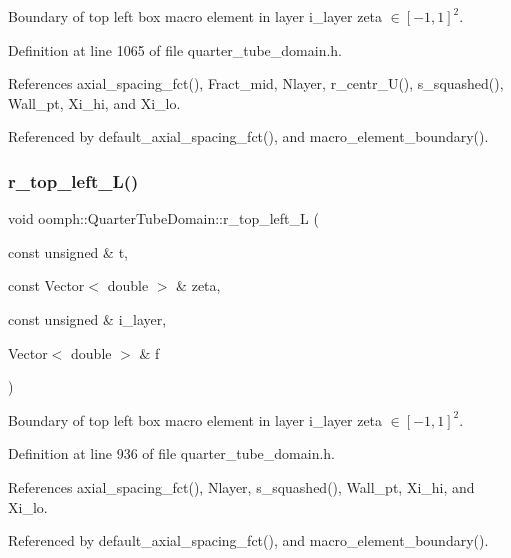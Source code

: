 Boundary of top left box macro element in layer i\+\_\+layer zeta $ \in [-1,1]^2 $. 



Definition at line 1065 of file quarter\+\_\+tube\+\_\+domain.\+h.



References axial\+\_\+spacing\+\_\+fct(), Fract\+\_\+mid, Nlayer, r\+\_\+centr\+\_\+\+U(), s\+\_\+squashed(), Wall\+\_\+pt, Xi\+\_\+hi, and Xi\+\_\+lo.



Referenced by default\+\_\+axial\+\_\+spacing\+\_\+fct(), and macro\+\_\+element\+\_\+boundary().

\mbox{\label{classoomph_1_1QuarterTubeDomain_a17a846a90e283ec86538f17145ad7923}} 
\subsubsection{\texorpdfstring{r\+\_\+top\+\_\+left\+\_\+\+L()}{r\_top\_left\_L()}}
{\footnotesize\ttfamily void oomph\+::\+Quarter\+Tube\+Domain\+::r\+\_\+top\+\_\+left\+\_\+L (\begin{DoxyParamCaption}\item[{const unsigned \&}]{t,  }\item[{const Vector$<$ double $>$ \&}]{zeta,  }\item[{const unsigned \&}]{i\+\_\+layer,  }\item[{Vector$<$ double $>$ \&}]{f }\end{DoxyParamCaption})\hspace{0.3cm}{\ttfamily [private]}}



Boundary of top left box macro element in layer i\+\_\+layer zeta $ \in [-1,1]^2 $. 



Definition at line 936 of file quarter\+\_\+tube\+\_\+domain.\+h.



References axial\+\_\+spacing\+\_\+fct(), Nlayer, s\+\_\+squashed(), Wall\+\_\+pt, Xi\+\_\+hi, and Xi\+\_\+lo.



Referenced by default\+\_\+axial\+\_\+spacing\+\_\+fct(), and macro\+\_\+element\+\_\+boundary().

